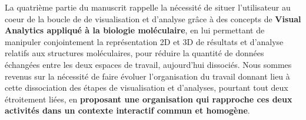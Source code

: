 


La quatrième partie du manuscrit rappelle la nécessité de situer l'utilisateur au coeur de la boucle de de visualisation et d'analyse grâce à des concepts de \textbf{Visual Analytics appliqué à la biologie moléculaire}, en lui permettant de manipuler conjointement la représentation 2D et 3D de résultats et d'analyse relatifs aux structures moléculaires, pour réduire la quantité de données échangées entre les deux espaces de travail, aujourd'hui dissociés. Nous sommes revenus sur la nécessité de faire évoluer l'organisation du travail donnant lieu à cette dissociation des étapes de visualisation et d'analyses, pourtant tout deux étroitement liées, en \textbf{proposant une organisation qui rapproche ces deux activités dans un contexte interactif commun et homogène}.

